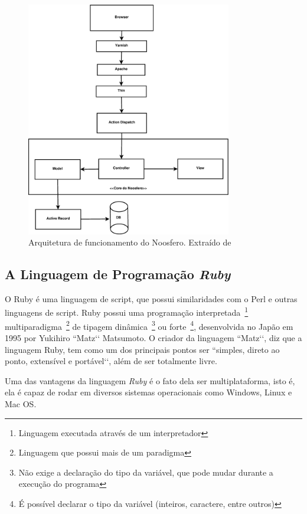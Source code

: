 \graphicspath{{figuras/}}
\begin{figure}[h]
\centering
\includegraphics[width=0.8\textwidth]{noosfero_architeture}
\caption[Arquitetura de funcionamento do Noosfero]{Arquitetura de funcionamento do Noosfero. Extraído de \cite{bucher2013rede}}
\label{fig:arquiteturanoosfero}
\end{figure}

\subsection{A Linguagem de Programação \textit{Ruby}}
\label{sec:linguagemruby}

O Ruby é uma linguagem de script, que possui similaridades com o Perl e outras linguagens de script. Ruby possui uma programação interpretada~\footnote{Linguagem executada através de um interpretador} multiparadigma~\footnote{Linguagem que possui mais de um paradigma} de tipagem dinâmica~\footnote{Não exige a declaração do tipo da variável, que pode mudar durante a execução do programa} ou forte~\footnote{É possível declarar o tipo da variável (inteiros, caractere, entre outros)}, desenvolvida no Japão em 1995 por Yukihiro ``Matz‘‘ Matsumoto. O criador da linguagem ``Matz‘‘, diz que a linguagem Ruby, tem como um dos principais pontos ser ``simples, direto ao ponto, extensível e portável‘‘, além de ser totalmente livre.

Uma das vantagens da linguagem \textit{Ruby} é o fato dela ser multiplataforma, isto é, ela é capaz de rodar em diversos sistemas operacionais como Windows, Linux e Mac OS.

